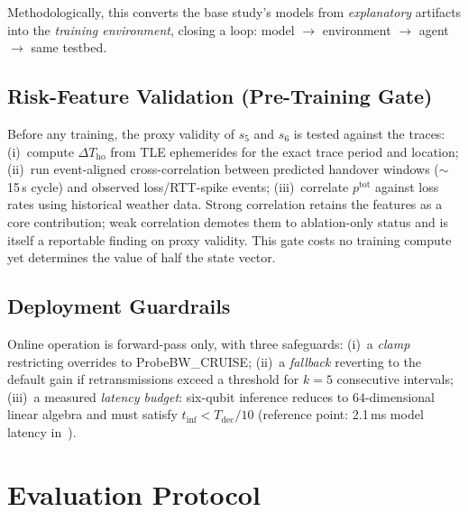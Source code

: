 \documentclass[journal]{IEEEtran}
\begin{document}
Methodologically, this converts the base study's models from
\emph{explanatory} artifacts into the \emph{training environment}, closing a
loop: model $\rightarrow$ environment $\rightarrow$ agent $\rightarrow$
same testbed.

\subsection{Risk-Feature Validation (Pre-Training Gate)}
\label{sec:riskval}
Before any training, the proxy validity of $s_5$ and $s_6$ is tested against
the traces: (i)~compute $\Delta T_{\mathrm{ho}}$ from TLE ephemerides for
the exact trace period and location; (ii)~run event-aligned
cross-correlation between predicted handover windows ($\sim$15\,s cycle) and
observed loss/RTT-spike events; (iii)~correlate $p^{\mathrm{tot}}$ against
loss rates using historical weather data. Strong correlation retains the
features as a core contribution; weak correlation demotes them to
ablation-only status and is itself a reportable finding on proxy validity.
This gate costs no training compute yet determines the value of half the
state vector.

\subsection{Deployment Guardrails}
\label{sec:guardrails}
Online operation is forward-pass only, with three safeguards: (i)~a
\emph{clamp} restricting overrides to ProbeBW\_CRUISE; (ii)~a
\emph{fallback} reverting to the default gain if retransmissions exceed a
threshold for $k{=}5$ consecutive intervals; (iii)~a measured
\emph{latency budget}: six-qubit inference reduces to $64$-dimensional
linear algebra and must satisfy $t_{\mathrm{inf}} < T_{\mathrm{dec}}/10$
(reference point: 2.1\,ms model latency in~\cite{yu2026dnccq}).

\section{Evaluation Protocol}
\label{sec:eval}
\end{document}
